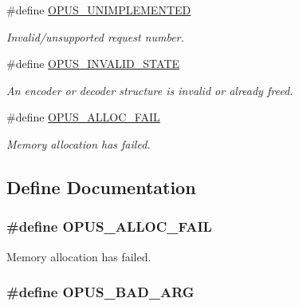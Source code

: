 \begin{DoxyCompactItemize}
\#define \hyperlink{group__opus__errorcodes_ga3b8d73b0f44b8b925ff40fd7c02b14a0}{OPUS\_\-UNIMPLEMENTED}
\begin{DoxyCompactList}\small\item\em Invalid/unsupported request number. \item\end{DoxyCompactList}\item 
\#define \hyperlink{group__opus__errorcodes_ga54416ec79619179d688918f25e9b20e3}{OPUS\_\-INVALID\_\-STATE}
\begin{DoxyCompactList}\small\item\em An encoder or decoder structure is invalid or already freed. \item\end{DoxyCompactList}\item 
\#define \hyperlink{group__opus__errorcodes_ga92fae6b1de2ac16b8d96561f9a8fb8b9}{OPUS\_\-ALLOC\_\-FAIL}
\begin{DoxyCompactList}\small\item\em Memory allocation has failed. \item\end{DoxyCompactList}\end{DoxyCompactItemize}


\subsection{Define Documentation}
\hypertarget{group__opus__errorcodes_ga92fae6b1de2ac16b8d96561f9a8fb8b9}{
\subsubsection[{OPUS\_\-ALLOC\_\-FAIL}]{\setlength{\rightskip}{0pt plus 5cm}\#define OPUS\_\-ALLOC\_\-FAIL}}
\label{group__opus__errorcodes_ga92fae6b1de2ac16b8d96561f9a8fb8b9}


Memory allocation has failed. \hypertarget{group__opus__errorcodes_gaf2d43e479455a1a3b6874e5faf4e827d}{
\subsubsection[{OPUS\_\-BAD\_\-ARG}]{\setlength{\rightskip}{0pt plus 5cm}\#define OPUS\_\-BAD\_\-ARG}}
\label{group__opus__errorcodes_gaf2d43e479455a1a3b6874e5faf4e827d}


